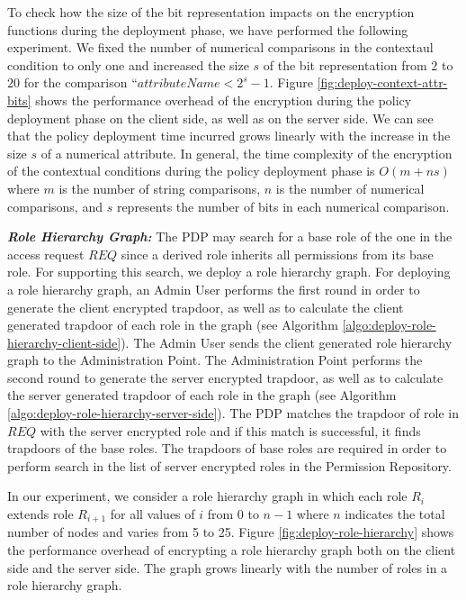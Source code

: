 \documentclass[final,5p,times,twocolumn]{elsarticle}
\begin{document}
To check how the size of the bit representation impacts on the encryption functions during the deployment phase, we have performed the following experiment. We fixed the number of numerical comparisons in the contextaul condition to only one and increased the size $s$ of the bit representation from $2$ to $20$ for the comparison ``$attributeName<2^s-1$. Figure \ref{fig:deploy-context-attr-bits} shows the performance overhead of the encryption during the policy deployment phase on the client side, as well as on the server side. We can see that the policy deployment time incurred grows linearly with the increase in the size $s$ of a numerical attribute. In general, the time complexity of the encryption of the contextual conditions during the policy deployment phase is $O(m+ns)$ where $m$ is the number of string comparisons, $n$ is the number of numerical comparisons, and $s$ represents the number of bits in each numerical comparison.


\emph{\textbf{Role Hierarchy Graph:}} 
The PDP may search for a base role of the one in the access request $\mathit{REQ}$ since a derived role inherits all permissions from its base role. For supporting this search, we deploy a role hierarchy graph. For deploying a role hierarchy graph, an Admin User performs the first round in order to generate the client encrypted trapdoor, as well as to calculate the client generated trapdoor of each role in the graph (see Algorithm \ref{algo:deploy-role-hierarchy-client-side}). The Admin User sends the client generated role hierarchy graph to the Administration Point. The Administration Point performs the second round to generate the server encrypted trapdoor, as well as to calculate the server generated trapdoor of each role in the graph (see Algorithm \ref{algo:deploy-role-hierarchy-server-side}). The PDP matches the trapdoor of role in $\mathit{REQ}$ with the server encrypted role and if this match is successful, it finds trapdoors of the base roles. The trapdoors of base roles are required in order to perform search in the list of server encrypted roles in the Permission Repository.

In our experiment, we consider a role hierarchy graph in which each role $R_i$ extends role $R_{i+1}$ for all values of $i$ from 0 to $n - 1$ where $n$ indicates the total number of nodes and varies from 5 to 25. Figure \ref{fig:deploy-role-hierarchy} shows the performance overhead of encrypting a role hierarchy graph both on the client side and the server side. The graph grows linearly with the number of roles in a role hierarchy graph.
\end{document}
